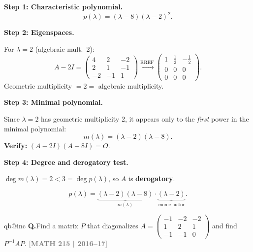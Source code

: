 \documentclass[12pt,a3paper]{article}
\makeatletter
\newcommand{\yr}[1]{\hfill\textcolor{gray}{\small\textbf{[#1]}}}
\newcounter{qnum}
\newcommand{\Q}[1]{%
  \csname qb@inc\endcsname
  \needspace{4\baselineskip}
  \refstepcounter{qnum}
  \vspace{6pt}
  \noindent\textbf{Q\theqnum.}\enspace #1\par
}
\makeatother
\begin{document}
\begin{tcolorbox}[enhanced,breakable,
  colback=cE!4,colframe=cE,boxrule=0.8pt,arc=5pt,
  title={\textbf{Answer --- Minimal Polynomial \& Derogatory Test for
    $A=\begin{pmatrix}6&2&-2\\2&3&-1\\-2&-1&3\end{pmatrix}$}},
  fonttitle=\bfseries\color{white},colbacktitle=cE]

\textbf{Step 1: Characteristic polynomial.}
\[
  p(\lambda)=(\lambda-8)(\lambda-2)^2.
\]

\textbf{Step 2: Eigenspaces.}

For $\lambda=2$ (algebraic mult.\ 2):
\[
  A-2I=\begin{pmatrix}4&2&-2\\2&1&-1\\-2&-1&1\end{pmatrix}
  \xrightarrow{\text{RREF}}
  \begin{pmatrix}1&\frac{1}{2}&-\frac{1}{2}\\0&0&0\\0&0&0\end{pmatrix}.
\]
Geometric multiplicity $=2=$ algebraic multiplicity.

\textbf{Step 3: Minimal polynomial.}

Since $\lambda=2$ has geometric multiplicity 2, it appears only to the \emph{first} power
in the minimal polynomial:
\[
  m(\lambda)=(\lambda-2)(\lambda-8).
\]
\textbf{Verify:} $(A-2I)(A-8I)=O$.\;\checkmark

\textbf{Step 4: Degree and derogatory test.}

$\deg m(\lambda)=2 < 3=\deg p(\lambda)$, so $A$ is \textbf{derogatory}.

\[
  p(\lambda) = \underbrace{(\lambda-2)(\lambda-8)}_{m(\lambda)}\cdot\underbrace{(\lambda-2)}_{\text{monic factor}}.
\]

\end{tcolorbox}

\Q{Find a matrix $P$ that diagonalizes $A = \begin{pmatrix} -1 & -2 & -2 \\ 1 & 2 & 1 \\ -1 & -1 & 0 \end{pmatrix}$ and find $P^{-1}AP$.
\yr{MATH 215 | 2016--17}}
\end{document}
